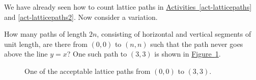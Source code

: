 \documentclass{book}
\begin{document}
\setcounter{cpjt}{172}
\addtocounter{cpjt}{-1}
\begin{activity}\label{act-lowerpaths}
\hypertarget{p-989}{}%
We have already seen how to count lattice paths in \hyperref[act-latticepaths]{Activities~\ref{act-latticepaths}} and \hyperref[act-latticepaths2]{\ref{act-latticepaths2}}.  Now consider a variation.%
\par
\hypertarget{p-990}{}%
How many paths of length \(2n\), consisting of horizontal and vertical segments of unit length, are there from \((0, 0)\) to \((n, n)\) such that the path never goes above the line \(y = x\)? One such path to \((3, 3)\) is shown in \hyperref[catalanpathex]{Figure~\ref{catalanpathex}}.%
\begin{figure}
\centering
{
}
\caption{One of the acceptable lattice paths from \((0,0)\) to \((3,3)\).\label{catalanpathex}}
\end{figure}
\par\smallskip%
\noindent\end{activity}

\clearpage
\end{document}
